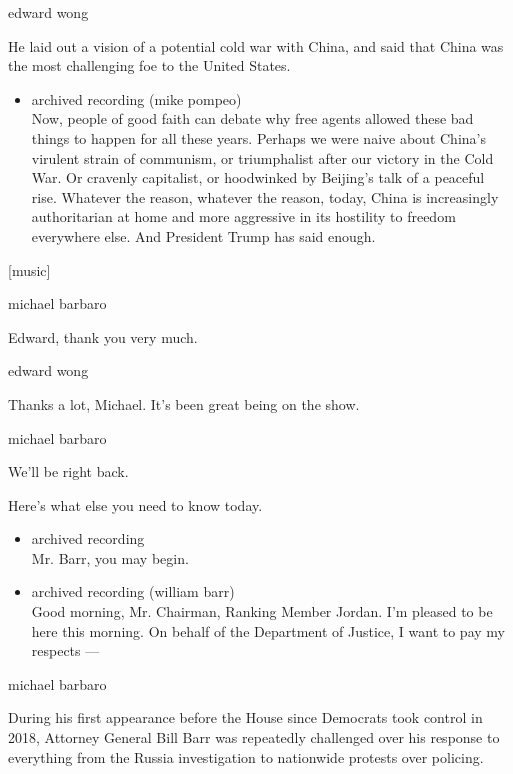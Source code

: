 edward wong

He laid out a vision of a potential cold war with China, and said that
China was the most challenging foe to the United States.

\begin{itemize}
\tightlist
\item
  archived recording (mike pompeo)\\
  Now, people of good faith can debate why free agents allowed these bad
  things to happen for all these years. Perhaps we were naive about
  China's virulent strain of communism, or triumphalist after our
  victory in the Cold War. Or cravenly capitalist, or hoodwinked by
  Beijing's talk of a peaceful rise. Whatever the reason, whatever the
  reason, today, China is increasingly authoritarian at home and more
  aggressive in its hostility to freedom everywhere else. And President
  Trump has said enough.
\end{itemize}

{[}music{]}

michael barbaro

Edward, thank you very much.

edward wong

Thanks a lot, Michael. It's been great being on the show.

michael barbaro

We'll be right back.

Here's what else you need to know today.

\begin{itemize}
\item
  archived recording\\
  Mr. Barr, you may begin.
\item
  archived recording (william barr)\\
  Good morning, Mr. Chairman, Ranking Member Jordan. I'm pleased to be
  here this morning. On behalf of the Department of Justice, I want to
  pay my respects ---
\end{itemize}

michael barbaro

During his first appearance before the House since Democrats took
control in 2018, Attorney General Bill Barr was repeatedly challenged
over his response to everything from the Russia investigation to
nationwide protests over policing.

